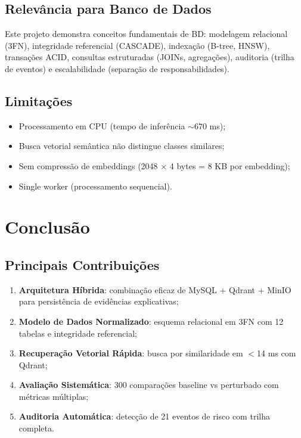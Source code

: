 \documentclass[12pt,a4paper,twoside]{article}
\begin{document}
\subsection{Relevância para Banco de Dados}

Este projeto demonstra conceitos fundamentais de BD: modelagem relacional (3FN), integridade referencial (CASCADE), indexação (B-tree, HNSW), transações ACID, consultas estruturadas (JOINs, agregações), auditoria (trilha de eventos) e escalabilidade (separação de responsabilidades).

\subsection{Limitações}

\begin{itemize}
    \item Processamento em CPU (tempo de inferência $\sim$670 ms);
    \item Busca vetorial semântica não distingue classes similares;
    \item Sem compressão de embeddings (2048 $\times$ 4 bytes = 8 KB por embedding);
    \item Single worker (processamento sequencial).
\end{itemize}

\section{Conclusão}
\label{sec:conclusao}

\subsection{Principais Contribuições}

\begin{enumerate}
    \item \textbf{Arquitetura Híbrida}: combinação eficaz de MySQL + Qdrant + MinIO para persistência de evidências explicativas;
    \item \textbf{Modelo de Dados Normalizado}: esquema relacional em 3FN com 12 tabelas e integridade referencial;
    \item \textbf{Recuperação Vetorial Rápida}: busca por similaridade em $<$14 ms com Qdrant;
    \item \textbf{Avaliação Sistemática}: 300 comparações baseline vs perturbado com métricas múltiplas;
    \item \textbf{Auditoria Automática}: detecção de 21 eventos de risco com trilha completa.
\end{enumerate}
\end{document}
